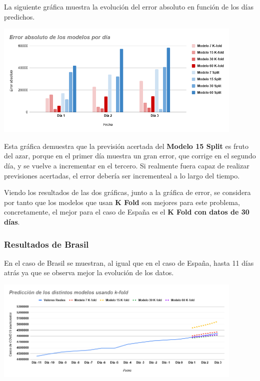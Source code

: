 \documentclass[12pt,a4paper, xcolor=table]{article}
\begin{document}
    \vspace{3mm}

    La siguiente gráfica muestra la evolución del error absoluto en función de los días predichos.

    \begin{center}
        \centering
        \includegraphics[width=450px]{img/error_modelos_ES.png}
    \end{center}

    Esta gráfica demuestra que la previsión acertada del \textbf{Modelo 15 Split} es fruto del azar, porque en el primer día muestra un gran error, que corrige en el segundo día, y se vuelve a incrementar en el tercero. Si realmente fuera capaz de realizar previsiones acertadas, el error debería ser incrementeal a lo largo del tiempo.

    \vspace{2mm}

    Viendo los resultados de las dos gráficas, junto a la gráfica de error, se considera por tanto que los modelos que usan \textbf{K Fold} son mejores para este problema, concretamente, el mejor para el caso de España es el \textbf{K Fold con datos de 30 días}.



    \subsubsection{Resultados de Brasil}

    En el caso de Brasil se muestran, al igual que en el caso de España, hasta 11 días atrás ya que se observa mejor la evolución de los datos.

    \begin{center}
        \includegraphics[width=450px]{img/pred_modelos_kFold_BZ.png}
    \end{center}
\end{document}
